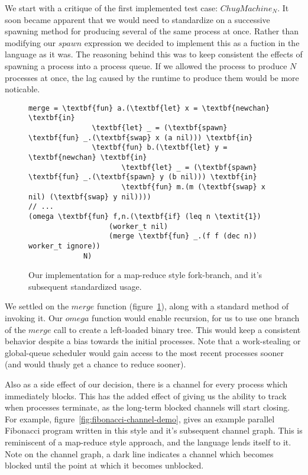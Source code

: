We start with a critique of the first implemented test case: $ChugMachine_N$. It
soon became apparent that we would need to standardize on a successive spawning
method for producing several of the same process at once. Rather than modifying
our $spawn$ expression we decided to implement this as a fuction in the language
as it was. The reasoning behind this was to keep consistent the effects of 
spawning a process into a process queue. If we allowed the process to produce $N$
processes at once, the lag caused by the runtime to produce them would be 
more noticable.

\begin{figure}
    \centering
{\footnotesize
\begin{BVerbatim}[commandchars=\\\{\}]
merge = \textbf{fun} a.(\textbf{let} x = \textbf{newchan} \textbf{in}
               \textbf{let} _ = (\textbf{spawn} \textbf{fun} _.(\textbf{swap} x (a nil))) \textbf{in}
               \textbf{fun} b.(\textbf{let} y = \textbf{newchan} \textbf{in} 
                      \textbf{let} _ = (\textbf{spawn} \textbf{fun} _.(\textbf{spawn} y (b nil))) \textbf{in}
                      \textbf{fun} m.(m (\textbf{swap} x nil) (\textbf{swap} y nil))))
// ...
(omega \textbf{fun} f,n.(\textbf{if} (leq n \textit{1}) 
                   (worker_t nil) 
                   (merge \textbf{fun} _.(f f (dec n)) worker_t ignore)) 
             N)
\end{BVerbatim}
}
    \caption{Our implementation for a map-reduce style fork-branch, and it's 
    subsequent standardized usage.}
    \label{fig:merge-code}
\end{figure}

We settled on the $merge$ function (figure~\ref{fig:merge-code}), along with a 
standard method of invoking it. Our $omega$ function would enable recursion, 
for us to use one branch of the $merge$ call to create a left-loaded binary
tree. This would keep a consistent behavior despite a bias towards the initial 
processes. Note that a work-stealing or global-queue scheduler would gain
access to the most recent processes sooner (and would thusly get a chance to
reduce sooner). 

Also as a side effect of our decision, there is a channel for every process which
immediately blocks. This has the added effect of giving us the ability to track when 
processes terminate, as the long-term blocked channels will start closing. For
example, figure~\ref{fig:fibonacci-channel-demo}, gives an example parallel
Fibonacci program written in this style and it's subsequent channel graph. This
is reminiscent of a map-reduce style approach, and the language lends itself
to it. Note on the channel graph, a dark line indicates a channel which 
becomes blocked until the point at which it becomes unblocked. 


